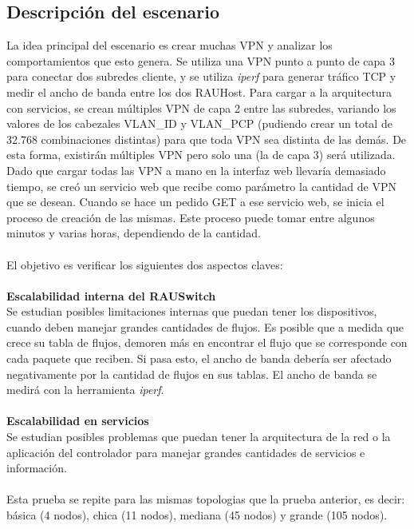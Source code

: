 \subsection{Descripción del escenario}
La idea principal del escenario es crear muchas VPN y analizar los comportamientos que esto genera. Se utiliza una VPN punto a punto de capa 3 para conectar dos subredes cliente, y se utiliza \textit{iperf} para generar tráfico TCP y medir el ancho de banda entre los dos RAUHost. Para cargar a la arquitectura con servicios, se crean múltiples VPN de capa 2 entre las subredes, variando los valores de los cabezales VLAN\_ID y VLAN\_PCP (pudiendo crear un total de 32.768 combinaciones distintas) para que toda VPN sea distinta de las demás. De esta forma, existirán múltiples VPN pero solo una (la de capa 3) será utilizada. \\
Dado que cargar todas las VPN a mano en la interfaz web llevaría demasiado tiempo, se creó un servicio web que recibe como parámetro la cantidad de VPN que se desean. Cuando se hace un pedido GET a ese servicio web, se inicia el proceso de creación de las mismas. Este proceso puede tomar entre algunos minutos y varias horas, dependiendo de la cantidad. \\ \\
El objetivo es verificar los siguientes dos aspectos claves: \\ \\
\textbf{Escalabilidad interna del RAUSwitch} \\
Se estudian posibles limitaciones internas que puedan tener los dispositivos, cuando deben manejar grandes cantidades de flujos. Es posible que a medida que crece su tabla de flujos, demoren más en encontrar el flujo que se corresponde con cada paquete que reciben. Si pasa esto, el ancho de banda debería ser afectado negativamente por la cantidad de flujos en sus tablas. El ancho de banda se medirá con la herramienta \textit{iperf}.  \\ \\
\textbf{Escalabilidad en servicios} \\
Se estudian posibles problemas que puedan tener la arquitectura de la red o la aplicación del controlador para manejar grandes cantidades de servicios e información. \\ \\
Esta prueba se repite para las mismas topologias que la prueba anterior, es decir: básica (4 nodos), chica (11 nodos), mediana (45 nodos) y grande (105 nodos).

